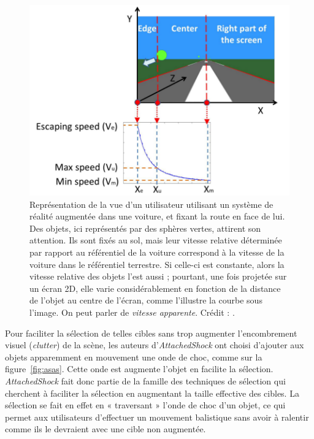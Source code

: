 	\begin{figure}[H]
		\centering
		\includegraphics[width=\textwidth]{figures/ch2/as2dspeed}
		\caption[\emph{AttachedShock}, profil de vitesse]{Représentation de la vue d'un utilisateur utilisant un système de réalité augmentée dans une voiture, et fixant la route en face de lui. Des objets, ici représentés par des sphères vertes, attirent son attention. Ils sont fixés au sol, mais leur vitesse relative déterminée par rapport au référentiel de la voiture correspond à la vitesse de la voiture dans le référentiel terrestre. Si celle-ci est constante, alors la vitesse relative des objets l'est aussi ; pourtant, une fois projetée sur un écran 2D, elle varie considérablement en fonction de la distance de l'objet au centre de l'écran, comme l'illustre la courbe sous l'image. On peut parler de \emph{vitesse apparente}. Crédit : \cite{you2012attachedshock}.}
		\label{fig:as2dspeed}
	\end{figure}
	
	Pour faciliter la sélection de telles cibles sans trop augmenter l'encombrement visuel (\emph{clutter}) de la scène, les auteurs d'\emph{AttachedShock} ont choisi d'ajouter aux objets apparemment en mouvement une onde de choc, comme sur la figure~\ref{fig:asas}. Cette onde est augmente l'objet en facilite la sélection. \emph{AttachedShock} fait donc partie de la famille des techniques de sélection qui cherchent à faciliter la sélection en augmentant la taille effective des cibles. La sélection se fait en effet en « traversant » l'onde de choc d'un objet, ce qui permet aux utilisateurs d'effectuer un mouvement balistique sans avoir à ralentir comme ils le devraient avec une cible non augmentée.

